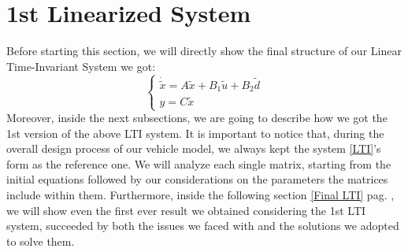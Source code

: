 \section{1st Linearized System} \label{1stLinSyst}
	Before starting this section, we will directly show the final structure of our Linear Time-Invariant System we got:
		\begin{equation} \label{LTI}
			\begin{cases}
				\dot{\tilde{x}} = A \tilde{x} + B_{1}\tilde{u} + B_{2}\tilde{d}\\
				y = C\tilde{x} 
			\end{cases}
		\end{equation}
	Moreover, inside the next subsections, we are going to describe how we got the 1st version of the above LTI system. It is important to notice that, during the overall design process of our vehicle model, we always kept the system \ref{LTI}'s form as the reference one. 
	We will analyze each single matrix, starting from the initial equations followed by our considerations on the parameters the matrices include within them. Furthermore, inside the following section \ref{Final LTI} pag. \pageref{Final LTI}, we will show even the first ever result we obtained considering the 1st LTI system, succeeded by both the issues we faced with and the solutions we adopted to solve them.
